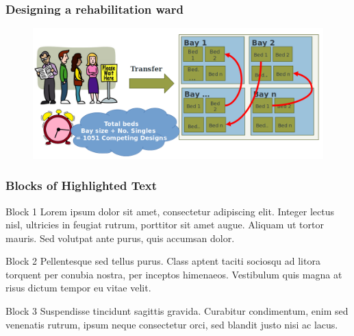 \documentclass[aspectratio=169]{beamer}
\begin{document}


\begin{frame}
\frametitle{Designing a rehabilitation ward}
\begin{figure}
\includegraphics[width=1.0\linewidth]{ward6.png}
\end{figure}
\end{frame}


\begin{frame}
\frametitle{Blocks of Highlighted Text}
\begin{block}{Block 1}
Lorem ipsum dolor sit amet, consectetur adipiscing elit. Integer lectus nisl, ultricies in feugiat rutrum, porttitor sit amet augue. Aliquam ut tortor mauris. Sed volutpat ante purus, quis accumsan dolor.
\end{block}

\begin{block}{Block 2}
Pellentesque sed tellus purus. Class aptent taciti sociosqu ad litora torquent per conubia nostra, per inceptos himenaeos. Vestibulum quis magna at risus dictum tempor eu vitae velit.
\end{block}

\begin{block}{Block 3}
Suspendisse tincidunt sagittis gravida. Curabitur condimentum, enim sed venenatis rutrum, ipsum neque consectetur orci, sed blandit justo nisi ac lacus.
\end{block}
\end{frame}

\end{document}
